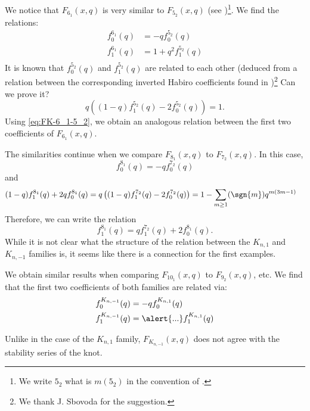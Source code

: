 \documentclass[11pt,e-only]{amsart}
\begin{document}
\begin{remark} We notice that $F_{6_1}(x,q)$ is very similar to $F_{5_2}(x,q)$ (see \cite[Eq. 31]{Park20})\footnote{We write $5_2$ what is $m(5_2)$ in the convention of \cite{Park20}.}. We find the relations:
\begin{equation}\label{eq:FK-6_1-5_2}
\begin{split}
    f_0^{6_1}(q) &= -q f_0^{5_2}(q) \\
    f_1^{6_1}(q) &= 1+q^2f_1^{5_2}(q)\\
\end{split}
\end{equation}
It is known that $f_0^{5_2}(q)$ and $f_1^{5_2}(q)$ are related to each other (deduced from a relation between the corresponding inverted Habiro coefficients found in \cite{Park21})\footnote{We thank J. Sbovoda for the suggestion.} \alert{Can we prove it?}
\begin{equation}
    q\left((1-q)f_1^{5_2}(q)-2f_0^{5_2}(q)\right) = 1.
\end{equation}
Using \eqref{eq:FK-6_1-5_2}, we obtain an analogous relation between the first two coefficients of $F_{6_1}(x,q)$.

The similarities continue when we compare $F_{8_1}(x,q)$ to $F_{7_2}(x,q)$. In this case,
\begin{equation}
    f_0^{8_1}(q) = -q f_0^{7_2}(q)
\end{equation}
and
\begin{equation}
\begin{split}
    (1-q)f_1^{8_1}(q)+2qf_0^{8_1}(q) &= q\left((1-q)f_1^{7_2}(q)-2f_0^{7_2}(q)\right) =  1 - \sum_{m\geq 1} (\sgn{m}) q^{m(3m - 1)}
\end{split}
\end{equation}
Therefore, we can write the relation
\begin{equation}
    f_1^{8_1}(q)=q f_1^{7_2}(q) + 2 f_0^{8_1}(q).
\end{equation}
While it is not clear what the structure of the relation between the $K_{n,1}$ and $K_{n,-1}$ families is, it seems like there is a connection for the first examples.

We obtain similar results when comparing $F_{10_1}(x,q)$ to $F_{9_2}(x,q)$, etc. We find that the first two coefficients of both families are related via:
\begin{equation}
\begin{split}
    f_0^{K_{n,-1}}(q)&=-qf_0^{K_{n,1}}(q) \\
    f_1^{K_{n,-1}}(q)&=\alert{...}f_1^{K_{n,1}}(q) \\
\end{split}
\end{equation}

Unlike in the case of the $K_{n,1}$ family, $F_{K_{n,-1}}(x,q)$ does not agree with the stability series of the knot. 
\end{remark}
\end{document}
